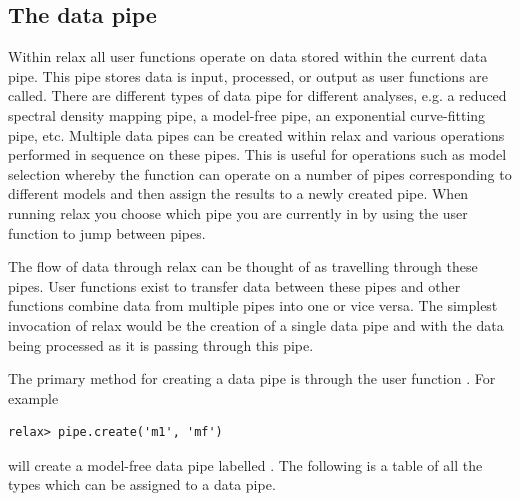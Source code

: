 \subsection{The data pipe} \label{sect: the data pipe}

Within relax all user functions operate on data stored within the current data pipe.  This pipe stores data is input, processed, or output as user functions are called.  There are different types of data pipe for different analyses, e.g. a reduced spectral density mapping pipe, a model-free pipe, an exponential curve-fitting pipe, etc.  Multiple data pipes can be created within relax and various operations performed in sequence on these pipes.  This is useful for operations such as model selection whereby the function  can operate on a number of pipes corresponding to different models and then assign the results to a newly created pipe.  When running relax you choose which pipe you are currently in by using the  user function to jump between pipes. 

The flow of data through relax can be thought of as travelling through these pipes.  User functions exist to transfer data between these pipes and other functions combine data from multiple pipes into one or vice versa.  The simplest invocation of relax would be the creation of a single data pipe and with the data being processed as it is passing through this pipe.

The primary method for creating a data pipe is through the user function .  For example

\begin{lstlisting}[numbers=none]
relax> pipe.create('m1', 'mf')
\end{lstlisting}

will create a model-free data pipe labelled .  The following is a table of all the types which can be assigned to a data pipe.

